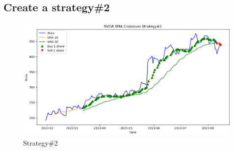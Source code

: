 \documentclass[12pt,a4paper]{article}
\begin{document}
\subsection{Create a strategy\#2}
\begin{figure}[h]
        \centering
        \includegraphics[scale=0.50]{Adj_SS/S2.png}
              \caption{Strategy\#2}
    \end{figure} 
\clearpage
\end{document}
